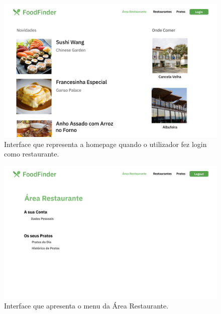 \documentclass[a4paper,12pt]{report}
\begin{document}
	\begin{figure}[H]
	\begin{center}
	\includegraphics[scale=0.25]{1.1-Menu_principal_restaurante}	
	\end{center}
	\caption{Interface que representa a homepage quando o utilizador fez login como restaurante.}
	\end{figure} 

	\begin{figure}[H]
	\begin{center}
	\includegraphics[scale=0.25]{2.1-Area_restaurante}	
	\end{center}
	\caption{Interface que apresenta o menu da Área Restaurante.}
	\end{figure} 
	
\end{document}
